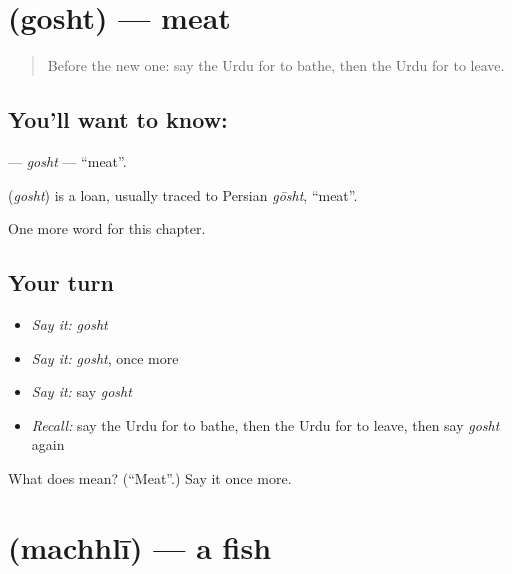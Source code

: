 \section[\texorpdfstring{\ur{گوشت} (gosht)}{گوشت (gosht)}]{ (gosht) — meat}

\label{lesson:UR-C53-gosht}



\begin{quote}
Before the new one: say the Urdu for to bathe, then the Urdu for to leave.
\end{quote}

\subsection*{You'll want to know: }
\textbf{} — \emph{gosht} — \textquotedblleft{}meat\textquotedblright{}.

\begin{cousinweb}
\textbf{} (\emph{gosht}) is a loan, usually traced to Persian \emph{gōsht}, \textquotedblleft{}meat\textquotedblright{}.
\end{cousinweb}

\begin{grammarlens}[title={What you've built}]
One more word for this chapter.
\end{grammarlens}

\subsection*{Your turn}
\begin{itemize}
\raggedright
  \item \emph{Say it:} \emph{gosht}
  \item \emph{Say it:} \emph{gosht}, once more
  \item \emph{Say it:} say \emph{gosht}
  \item \emph{Recall:} say the Urdu for to bathe, then the Urdu for to leave, then say \emph{gosht} again
\end{itemize}

\begin{tcolorbox}[breakable,colback=teal!4,colframe=teal!35!black,title={Before you move on}]
What does  mean? (\textquotedblleft{}Meat\textquotedblright{}.) Say it once more.
\end{tcolorbox}
\section[\texorpdfstring{\ur{مچھلی} (machhlī)}{مچھلی (machhlī)}]{ (machhlī) — a fish}

